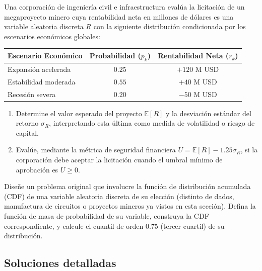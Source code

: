 \begin{problema}
	\label{prob:d332420}
	Una corporación de ingeniería civil e infraestructura evalúa la licitación de un megaproyecto minero cuya rentabilidad neta en millones de dólares es una variable aleatoria discreta $R$ con la siguiente distribución condicionada por los escenarios económicos globales:
	\begin{center}
		\begin{tabular}{l|cc}
			\hline
			\textbf{Escenario Económico} & \textbf{Probabilidad ($p_k$)} & \textbf{Rentabilidad Neta ($r_k$)} \\
			\hline
			Expansión acelerada & $0.25$ & $+120$ M USD \\
			Estabilidad moderada & $0.55$ & $+40$ M USD \\
			Recesión severa & $0.20$ & $-50$ M USD \\
			\hline
		\end{tabular}
	\end{center}
	\begin{enumerate}
		\item Determine el valor esperado del proyecto $\mathbb{E}[R]$ y la desviación estándar del retorno $\sigma_R$, interpretando esta última como medida de volatilidad o riesgo de capital.
		\item Evalúe, mediante la métrica de seguridad financiera $U = \mathbb{E}[R] - 1.25\sigma_R$, si la corporación debe aceptar la licitación cuando el umbral mínimo de aprobación es $U \ge 0$.
	\end{enumerate}
\end{problema}

\begin{problema}
	\label{prob:e538b1b}
	Diseñe un problema original que involucre la función de distribución acumulada (CDF) de una variable aleatoria discreta de su elección (distinto de dados, manufactura de circuitos o proyectos mineros ya vistos en esta sección). Defina la función de masa de probabilidad de su variable, construya la CDF correspondiente, y calcule el cuantil de orden $0.75$ (tercer cuartil) de su distribución.
\end{problema}

\subsection*{Soluciones detalladas}

